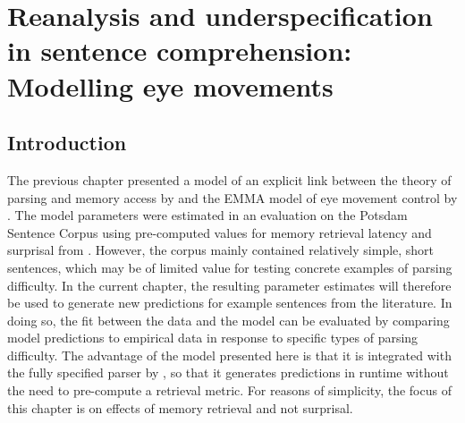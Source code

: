 \documentclass{cambridge7A}\usepackage[]{graphicx}\usepackage[]{color}
\begin{document}

\chapter[Reanalysis and underspecification]{Reanalysis and underspecification in sentence comprehension: Modelling eye movements} \label{c04}

\section{Introduction}



The previous chapter presented a model of an explicit link between the theory of parsing and memory access by \cite{LewisVasishth2005} and the EMMA model of eye movement control by \cite{Salvucci2001}.
The model parameters were estimated in an evaluation on the Potsdam Sentence Corpus \citep{Kliegl2004} using pre-computed values for memory retrieval latency and surprisal from \cite{BostonHaleVasishth2011}. However, the corpus mainly contained relatively simple, short sentences, which may be of limited value for testing concrete examples of parsing difficulty. In the current chapter, the resulting parameter estimates will therefore be used to generate new predictions for example sentences from the literature. In doing so, the fit between the data and the model can be evaluated by comparing model predictions to empirical data in response to specific types of parsing difficulty. 
The advantage of the model presented here is that it is integrated with the fully specified parser by \cite{LewisVasishth2005}, so that it generates predictions in runtime without the need to pre-compute a retrieval metric. For reasons of simplicity, the focus of this chapter is on effects of memory retrieval and not surprisal.
\end{document}
